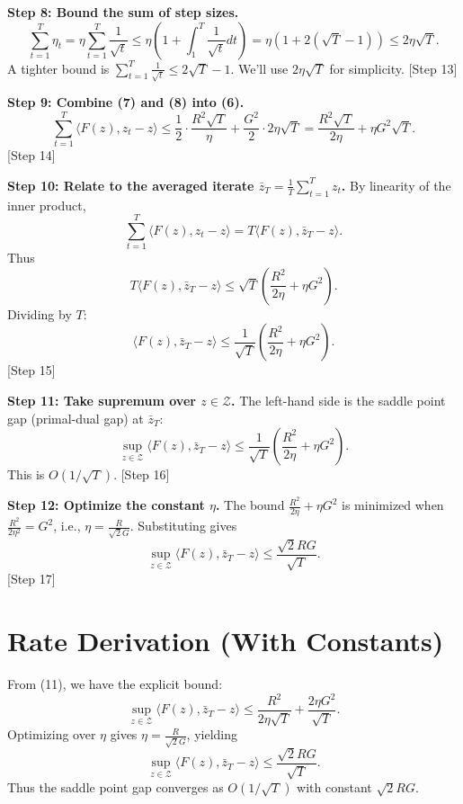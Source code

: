 \documentclass{article}
\begin{document}
\textbf{Step 8: Bound the sum of step sizes.}
\[
\sum_{t=1}^T \eta_t = \eta \sum_{t=1}^T \frac{1}{\sqrt{t}} \le \eta \left( 1 + \int_1^T \frac{1}{\sqrt{t}} dt \right) = \eta \left( 1 + 2(\sqrt{T} - 1) \right) \le 2\eta \sqrt{T}. \tag{8}
\]
A tighter bound is $\sum_{t=1}^T \frac{1}{\sqrt{t}} \le 2\sqrt{T} - 1$. We'll use $2\eta\sqrt{T}$ for simplicity. [Step 13]

\textbf{Step 9: Combine (7) and (8) into (6).}
\[
\sum_{t=1}^T \langle F(z), z_t - z \rangle \le \frac{1}{2} \cdot \frac{R^2 \sqrt{T}}{\eta} + \frac{G^2}{2} \cdot 2\eta \sqrt{T}
= \frac{R^2 \sqrt{T}}{2\eta} + \eta G^2 \sqrt{T}. \tag{9}
\]
[Step 14]

\textbf{Step 10: Relate to the averaged iterate $\bar{z}_T = \frac{1}{T}\sum_{t=1}^T z_t$.}
By linearity of the inner product,
\[
\sum_{t=1}^T \langle F(z), z_t - z \rangle = T \langle F(z), \bar{z}_T - z \rangle.
\]
Thus
\[
T \langle F(z), \bar{z}_T - z \rangle \le \sqrt{T} \left( \frac{R^2}{2\eta} + \eta G^2 \right).
\]
Dividing by $T$:
\[
\langle F(z), \bar{z}_T - z \rangle \le \frac{1}{\sqrt{T}} \left( \frac{R^2}{2\eta} + \eta G^2 \right). \tag{10}
\]
[Step 15]

\textbf{Step 11: Take supremum over $z \in \mathcal{Z}$.}
The left-hand side is the saddle point gap (primal-dual gap) at $\bar{z}_T$:
\[
\sup_{z \in \mathcal{Z}} \langle F(z), \bar{z}_T - z \rangle \le \frac{1}{\sqrt{T}} \left( \frac{R^2}{2\eta} + \eta G^2 \right). \tag{11}
\]
This is $O(1/\sqrt{T})$. [Step 16]

\textbf{Step 12: Optimize the constant $\eta$.}
The bound $\frac{R^2}{2\eta} + \eta G^2$ is minimized when $\frac{R^2}{2\eta^2} = G^2$, i.e., $\eta = \frac{R}{\sqrt{2} G}$. Substituting gives
\[
\sup_{z \in \mathcal{Z}} \langle F(z), \bar{z}_T - z \rangle \le \frac{\sqrt{2} R G}{\sqrt{T}}. \tag{12}
\]
[Step 17]

\section*{Rate Derivation (With Constants)}

From (11), we have the explicit bound:
\[
\sup_{z \in \mathcal{Z}} \langle F(z), \bar{z}_T - z \rangle \le \frac{R^2}{2\eta\sqrt{T}} + \frac{2\eta G^2}{\sqrt{T}}.
\]
Optimizing over $\eta$ gives $\eta = \frac{R}{\sqrt{2}G}$, yielding
\[
\sup_{z \in \mathcal{Z}} \langle F(z), \bar{z}_T - z \rangle \le \frac{\sqrt{2} R G}{\sqrt{T}}.
\]
Thus the saddle point gap converges as $O(1/\sqrt{T})$ with constant $\sqrt{2} R G$.
\end{document}
